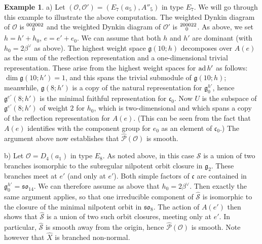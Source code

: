 \documentclass{amsart}
\theoremstyle{definition}
\newtheorem{example}[theorem]{Example}
\newcommand{\g}{\mathfrak{g}}
\newcommand{\cg}{\mathfrak{c}}
\newcommand{\0}{\mathcal{O}}
\begin{document}
\begin{example}\label{extraS3examples}
a) Let $(\0,\0')=(E_7(a_5),A''_5)$ in type $E_7$.
We will go through this example to illustrate the above computation.
The weighted Dynkin diagram of $\0$ is $\scriptsize{\begin{aligned}00 &2002 \\[-1.8mm] &0\end{aligned}}$ and the weighted Dynkin diagram of $\0'$ is $\scriptsize{\begin{aligned}20 &0022 \\[-1.8mm] &0\end{aligned}}$.
As above, we set $h=h'+h_0$, $e=e'+e_0$.
We can assume that both $h$ and $h'$ are dominant (with $h_0=2\beta^\vee$ as above).
The highest weight space $\g(10;h)$ decomposes over $A(e)$ as the sum of the reflection representation and a one-dimensional trivial representation.
These arise from the highest weight spaces for ${\rm ad}\, h'$ as follows: $\dim\g(10;h')=1$, and this spans the trivial submodule of $\g(10;h)$; meanwhile, $\g(8;h')$ is a copy of the natural representation for $\g^{h'}_0$, hence $\g^{e'}(8;h')$ is the minimal faithful representation for $\cg_0$.
Now $U$ is the subspace of $\g^{e'}(8;h')$ of weight $2$ for $h_0$, which is two-dimensional and which spans a copy of the reflection representation for $A(e)$.
(This can be seen from the fact that $A(e)$ identifies with the component group for $e_0$ as an element of $\cg_0$.)
The argument above now establishes that $\hat{\mathcal P}(\0)$ is smooth.

b) Let $\0=D_4(a_1)$ in type $E_8$.
As noted above, in this case ${\mathcal S}$ is a union of two branches isomorphic to the subregular nilpotent orbit closure in $\g_2$.
These branches meet at $e'$ (and only at $e'$).
Both simple factors of $\cg$ are contained in $\g^{h'}_0=\mathfrak{so}_{14}$.
We can therefore assume as above that $h_0=2\beta^\vee$.
Then exactly the same argument applies, so that one irreducible component of $\hat{\mathcal S}$ is isomorphic to the closure of the minimal nilpotent orbit in $\mathfrak{so}_8$.
The action of $A(e')$ then shows that $\hat{\mathcal S}$ is a union of two such orbit closures, meeting only at $e'$.
In particular, $\hat{\mathcal S}$ is smooth away from the origin, hence $\hat{\mathcal P}(\0)$ is smooth.
Note however that $\hat{X}$ is branched non-normal.

\end{example}
\end{document}
